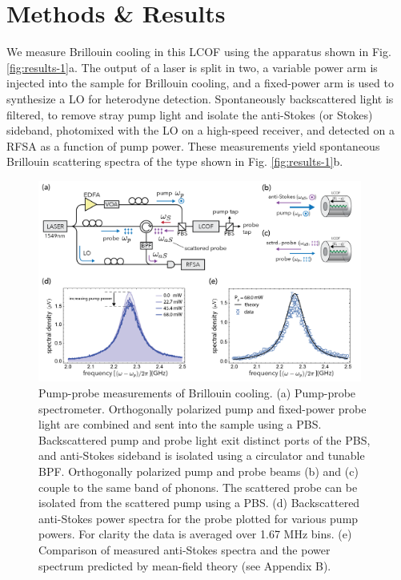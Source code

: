 \section{Methods \& Results}
We measure Brillouin cooling in this \ac{LCOF} using the apparatus shown in Fig. \ref{fig:results-1}a. The output of a laser is split in two, a variable power arm is injected into the sample for Brillouin cooling, and a fixed-power arm is used to synthesize a \ac{LO} for heterodyne detection. Spontaneously backscattered light is filtered, to remove stray pump light and isolate the anti-Stokes (or Stokes) sideband, photomixed with the \ac{LO} on a high-speed receiver, and detected on a \ac{RFSA} as a function of pump power. These measurements yield spontaneous Brillouin scattering spectra of the type shown in Fig. \ref{fig:results-1}b.

\begin{figure}[t]
    \centering \includegraphics[width=0.95\textwidth]{figs/2-Cooling/apparatus_pump_probe_v4-01.png}
    \caption{Pump-probe measurements of Brillouin cooling. (a) Pump-probe spectrometer. Orthogonally polarized pump and fixed-power probe light are combined and sent into the sample using a \ac{PBS}. Backscattered pump and probe light exit distinct ports of the PBS, and anti-Stokes sideband is isolated using a circulator and tunable  \ac{BPF}. Orthogonally polarized pump and probe beams (b) and (c) couple to the same band of phonons. The scattered probe can be isolated from the scattered pump using a PBS.
    (d) Backscattered anti-Stokes power spectra for the probe plotted for various pump powers. For clarity the data is averaged over 1.67 MHz bins. (e) Comparison of measured anti-Stokes spectra and the power spectrum predicted by mean-field theory (see Appendix B).}
    \label{fig:results-2}
\end{figure}

